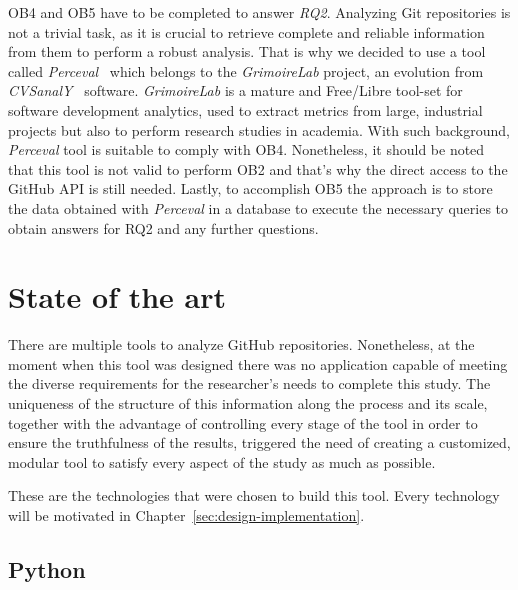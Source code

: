 \documentclass[a4paper, 12pt]{book}
\begin{document}
OB4 and OB5 have to be completed to answer \emph{RQ2}. Analyzing Git repositories is not a trivial task, as it is crucial
to retrieve complete and reliable information from them to perform a robust analysis. That is why we decided to
use a tool called \emph{Perceval}~\cite{duenas18:perceval} which belongs to the \emph{GrimoireLab} project, an evolution from \emph{CVSanalY}~\cite{robles2009tools} software.
\emph{GrimoireLab} is a mature and Free/Libre tool-set for software development analytics, used to extract metrics from large, industrial projects but
also to perform research studies in academia. With such background, \emph{Perceval} tool is suitable to comply with OB4.
Nonetheless, it should be noted that this tool is not valid to perform OB2 and that's why the direct access to the
GitHub API is still needed. Lastly, to accomplish OB5 the approach is to store the data obtained with \emph{Perceval} in a database to execute
the necessary queries to obtain answers for RQ2 and any further questions.
\cleardoublepage
\chapter{State of the art}
\label{sec:state-art}

There are multiple tools to analyze GitHub repositories. Nonetheless, at the moment when this tool was designed
there was no application capable of meeting the diverse requirements for the
researcher's needs to complete this study.
The uniqueness of the structure of this information along the process and its scale, together with the advantage of
controlling every stage of the tool in order to ensure the truthfulness of the results, triggered the need of
creating a customized, modular tool to satisfy every aspect of the study as much as possible.

These are the technologies that were chosen to build this tool. Every technology will be motivated in Chapter~\ref{sec:design-implementation}.

\section{Python}
\label{sec:python}
\end{document}
